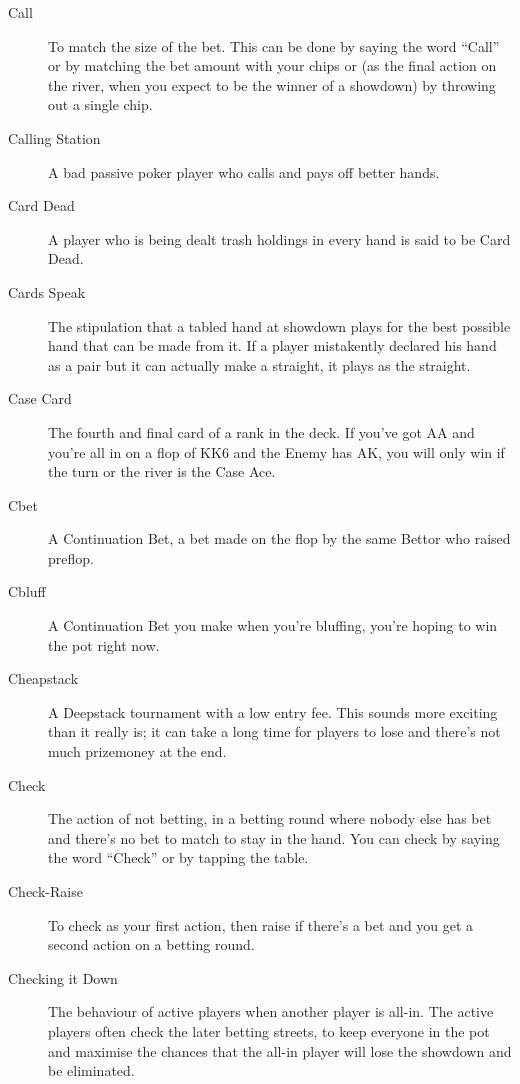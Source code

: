 \begin{description}
\item[Call] To match the size of the bet. This can be done by saying
the word ``Call'' or by matching the bet amount with your chips or
(as the final action on the river, when you expect to be the winner of
a showdown) by throwing out a single chip.

\item[Calling Station] A bad passive poker player who calls and pays
off better hands.

\item[Card Dead] A player who is being dealt trash holdings in every
hand is said to be Card Dead.

\item[Cards Speak] The stipulation that a tabled hand at showdown
plays for the best possible hand that can be made from it. If a player
mistakently declared his hand as a pair but it can actually make a
straight, it plays as the straight.

\item[Case Card] The fourth and final card of a rank in the deck. If
you've got AA and you're all in on a flop of KK6 and the Enemy has AK,
you will only win if the turn or the river is the Case Ace.

\item[Cbet] A Continuation Bet, a bet made on the flop by the same Bettor
who raised preflop.

\item[Cbluff] A Continuation Bet you make when you're bluffing, you're
hoping to win the pot right now.

\item[Cheapstack] A Deepstack tournament with a low entry fee. This
sounds more exciting than it really is; it can take a long time for
players to lose and there's not much prizemoney at the end.

\item[Check] The action of not betting, in a betting round where
nobody else has bet and there's no bet to match to stay in the hand.
You can check by saying the word ``Check'' or by tapping the table.

\item[Check-Raise] To check as your first action, then raise if
there's a bet and you get a second action on a betting round.

\item[Checking it Down] The behaviour of active players when another
player is all-in. The active players often check the later betting
streets, to keep everyone in the pot and maximise the chances that the
all-in player will lose the showdown and be eliminated.


\end{description}
